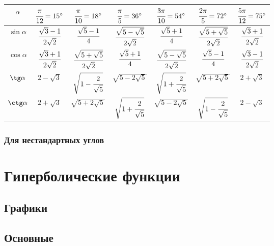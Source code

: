 \begin{tabu}[t]{||c|c|c|c|c|c|c||}
	\hline
		$ \alpha $ &
			$ \cfrac{\pi}{12}  =  15^{\circ} $ &
			$ \cfrac{\pi}{10} = 18^{\circ} $ &
			$ \cfrac{\pi}{5} = 36^{\circ} $ &
			$ \cfrac{3\pi}{10} = 54^{\circ} $ &
			$ \cfrac{2\pi}{5} = 72^{\circ} $ &
			$ \cfrac{5\pi}{12} = 75^{\circ} $ \\
	\hline
		$ \sin \alpha $ &
		$ \cfrac{\sqrt{3}-1}{2\sqrt{2}} $ & 	
		$ \cfrac{\sqrt{5}-1}{4} $ & 	
		$ \cfrac{\sqrt{5-\sqrt{5}}}{2\sqrt{2}} $ & 	
		$ \cfrac{\sqrt{5}+1}{4} $ & 	
		$ \cfrac{\sqrt{5+\sqrt{5}}}{2\sqrt{2}} $ & 	
		$ \cfrac{\sqrt{3}+1}{2\sqrt{2}} $ \\
	\hline
		$ \cos \alpha $ & 	
		$ \cfrac{\sqrt{3}+1}{2\sqrt{2}} $ & 	
		$ \cfrac{\sqrt{5+\sqrt{5}}}{2\sqrt{2}} $ & 	
		$ \cfrac{\sqrt{5}+1}{4} $ & 	
		$ \cfrac{\sqrt{5-\sqrt{5}}}{2\sqrt{2}} $ & 	
		$ \cfrac{\sqrt{5}-1}{4} $ & 	
		$ \cfrac{\sqrt{3}-1}{2\sqrt{2}} $ \\
	\hline
		$ \tg \alpha $ & 	
		$ 2-\sqrt{3} $ & 	
		$ \sqrt{1-\cfrac{2}{\sqrt{5}}} $ & 	
		$ \sqrt{5-2\sqrt{5}} $ & 	
		$ \sqrt{1+\cfrac{2}{\sqrt{5}}} $ & 	
		$ \sqrt{5+2\sqrt{5}} $ & 	
		$ 2+\sqrt{3} $ \\
	\hline
		$ \ctg \alpha $ & 
		$ 2+\sqrt{3} $ & 	
		$ \sqrt{5+2\sqrt{5}} $ & 	
		$ \sqrt{1+\cfrac{2}{\sqrt{5}}} $ & 	
		$ \sqrt{5-2\sqrt{5}} $ & 	
		$ \sqrt{1-\cfrac{2}{\sqrt{5}}} $ & 	
		$ 2-\sqrt{3} $ \\
	\hline
\end{tabu}

\subsubsection{Для нестандартных углов}


\section{Гиперболические функции}

\subsection{Графики}

\subsection{Основные}


